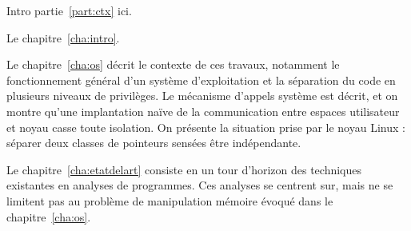 \begin{headingpage}

Intro partie~\ref{part:ctx} ici.

Le chapitre~\ref{cha:intro}.

Le chapitre~\ref{cha:os} décrit le contexte de ces travaux, notamment le fonctionnement
général d'un système d'exploitation et la séparation du code en plusieurs
niveaux de privilèges. Le mécanisme d'appels système est décrit, et on montre
qu'une implantation naïve de la communication entre espaces utilisateur et noyau
casse toute isolation. On présente la situation prise par le noyau Linux :
séparer deux classes de pointeurs sensées être indépendante.

Le chapitre~\ref{cha:etatdelart} consiste en un tour d'horizon des techniques
existantes en analyses de programmes. Ces analyses se centrent sur, mais ne se
limitent pas au problème de manipulation mémoire évoqué dans le
chapitre~\ref{cha:os}.

\end{headingpage}
